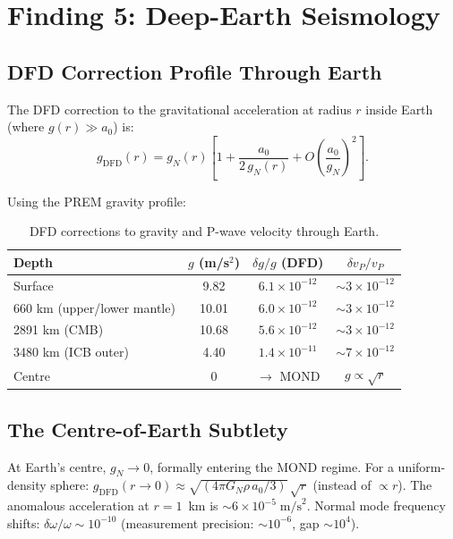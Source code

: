 \documentclass[11pt]{article}
\theoremstyle{definition}
\theoremstyle{remark}
\newcommand{\ee}[1]{\times10^{#1}}
\begin{document}
\section{Finding 5: Deep-Earth Seismology}
\label{sec:seismo}

\subsection{DFD Correction Profile Through Earth}

The DFD correction to the gravitational acceleration at radius $r$
inside Earth (where $g(r) \gg a_0$) is:
\begin{equation}
g_{\mathrm{DFD}}(r) = g_N(r)\left[1 + \frac{a_0}{2\,g_N(r)}
  + O\!\left(\frac{a_0}{g_N}\right)^2\right].
\end{equation}

Using the PREM gravity profile:
\begin{table}[H]
\centering
\small
\begin{tabular}{@{}lccc@{}}
\toprule
Depth & $g$ (m/s$^2$) & $\delta g/g$ (DFD) & $\delta v_P/v_P$ \\
\midrule
Surface & 9.82 & $6.1\ee{-12}$ & $\sim 3\ee{-12}$ \\
660 km (upper/lower mantle) & 10.01 & $6.0\ee{-12}$ & $\sim 3\ee{-12}$ \\
2891 km (CMB) & 10.68 & $5.6\ee{-12}$ & $\sim 3\ee{-12}$ \\
3480 km (ICB outer) & 4.40 & $1.4\ee{-11}$ & $\sim 7\ee{-12}$ \\
Centre & 0 & $\to$ MOND & $g \propto \sqrt{r}$ \\
\bottomrule
\end{tabular}
\caption{DFD corrections to gravity and P-wave velocity through Earth.}
\end{table}

\subsection{The Centre-of-Earth Subtlety}

At Earth's centre, $g_N \to 0$, formally entering the MOND regime.
For a uniform-density sphere: $g_{\mathrm{DFD}}(r \to 0) \approx
\sqrt{(4\pi G_N \rho\,a_0/3)}\,\sqrt{r}$ (instead of $\propto r$).
The anomalous acceleration at $r = 1$~km is $\sim 6\ee{-5}\;\mathrm{m/s}^2$.
Normal mode frequency shifts: $\delta\omega/\omega \sim 10^{-10}$
(measurement precision: $\sim 10^{-6}$, gap $\sim 10^4$).
\end{document}
